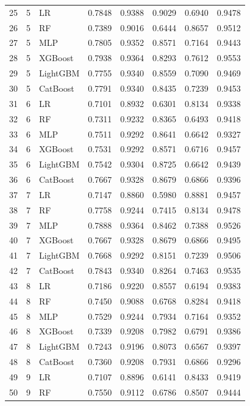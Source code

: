 \documentclass[diagnostics,article,accept,pdftex,moreauthors]{Definitions/mdpi}
\begin{document}
\begin{table}[H]
\begin{tabularx}{\linewidth}{LlLCCCCC}
25 & 5  & LR       & 0.7848 & 0.9388 & 0.9029 & 0.6940 & 0.9478 \\
26 & 5  & RF       & 0.7389 & 0.9016 & 0.6444 & 0.8657 & 0.9512 \\
27 & 5  & MLP      & 0.7805 & 0.9352 & 0.8571 & 0.7164 & 0.9443 \\
28 & 5  & XGBoost  & 0.7938 & 0.9364 & 0.8293 & 0.7612 & 0.9553 \\
29 & 5  & LightGBM & 0.7755 & 0.9340 & 0.8559 & 0.7090 & 0.9469 \\
30 & 5  & CatBoost & 0.7791 & 0.9340 & 0.8435 & 0.7239 & 0.9453 \\
31 & 6  & LR       & 0.7101 & 0.8932 & 0.6301 & 0.8134 & 0.9338 \\
32 & 6  & RF       & 0.7311 & 0.9232 & 0.8365 & 0.6493 & 0.9418 \\
33 & 6  & MLP      & 0.7511 & 0.9292 & 0.8641 & 0.6642 & 0.9327 \\
34 & 6  & XGBoost  & 0.7531 & 0.9292 & 0.8571 & 0.6716 & 0.9457 \\
35 & 6  & LightGBM & 0.7542 & 0.9304 & 0.8725 & 0.6642 & 0.9439 \\
36 & 6  & CatBoost & 0.7667 & 0.9328 & 0.8679 & 0.6866 & 0.9396 \\
37 & 7  & LR       & 0.7147 & 0.8860 & 0.5980 & 0.8881 & 0.9457 \\
38 & 7  & RF       & 0.7758 & 0.9244 & 0.7415 & 0.8134 & 0.9478 \\
39 & 7  & MLP      & 0.7888 & 0.9364 & 0.8462 & 0.7388 & 0.9526 \\
40 & 7  & XGBoost  & 0.7667 & 0.9328 & 0.8679 & 0.6866 & 0.9495 \\
41 & 7  & LightGBM & 0.7668 & 0.9292 & 0.8151 & 0.7239 & 0.9506 \\
42 & 7  & CatBoost & 0.7843 & 0.9340 & 0.8264 & 0.7463 & 0.9535 \\
43 & 8  & LR       & 0.7186 & 0.9220 & 0.8557 & 0.6194 & 0.9383 \\
44 & 8  & RF       & 0.7450 & 0.9088 & 0.6768 & 0.8284 & 0.9418 \\
45 & 8  & MLP      & 0.7529 & 0.9244 & 0.7934 & 0.7164 & 0.9352 \\
46 & 8  & XGBoost  & 0.7339 & 0.9208 & 0.7982 & 0.6791 & 0.9386 \\
47 & 8  & LightGBM & 0.7243 & 0.9196 & 0.8073 & 0.6567 & 0.9397 \\
48 & 8  & CatBoost & 0.7360 & 0.9208 & 0.7931 & 0.6866 & 0.9296 \\
49 & 9  & LR       & 0.7107 & 0.8896 & 0.6141 & 0.8433 & 0.9419 \\
50 & 9  & RF       & 0.7550 & 0.9112 & 0.6786 & 0.8507 & 0.9444 \\
\bottomrule
\end{tabularx}


\end{table}
\end{document}

